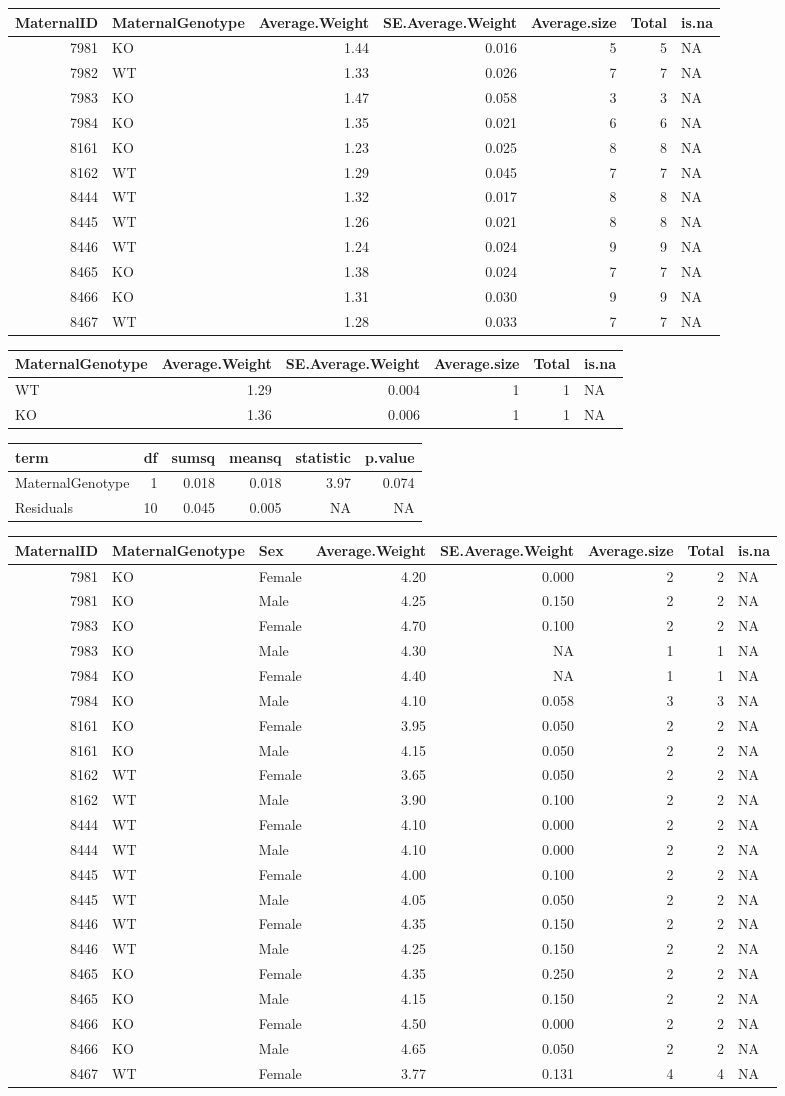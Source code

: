 \documentclass[]{article}
\begin{document}
\begin{longtable}[]{@{}rlrrrrl@{}}
\toprule
MaternalID & MaternalGenotype & Average.Weight & SE.Average.Weight &
Average.size & Total & is.na\tabularnewline
\midrule
\endhead
7981 & KO & 1.44 & 0.016 & 5 & 5 & NA\tabularnewline
7982 & WT & 1.33 & 0.026 & 7 & 7 & NA\tabularnewline
7983 & KO & 1.47 & 0.058 & 3 & 3 & NA\tabularnewline
7984 & KO & 1.35 & 0.021 & 6 & 6 & NA\tabularnewline
8161 & KO & 1.23 & 0.025 & 8 & 8 & NA\tabularnewline
8162 & WT & 1.29 & 0.045 & 7 & 7 & NA\tabularnewline
8444 & WT & 1.32 & 0.017 & 8 & 8 & NA\tabularnewline
8445 & WT & 1.26 & 0.021 & 8 & 8 & NA\tabularnewline
8446 & WT & 1.24 & 0.024 & 9 & 9 & NA\tabularnewline
8465 & KO & 1.38 & 0.024 & 7 & 7 & NA\tabularnewline
8466 & KO & 1.31 & 0.030 & 9 & 9 & NA\tabularnewline
8467 & WT & 1.28 & 0.033 & 7 & 7 & NA\tabularnewline
\bottomrule
\end{longtable}

\begin{longtable}[]{@{}lrrrrl@{}}
\toprule
MaternalGenotype & Average.Weight & SE.Average.Weight & Average.size &
Total & is.na\tabularnewline
\midrule
\endhead
WT & 1.29 & 0.004 & 1 & 1 & NA\tabularnewline
KO & 1.36 & 0.006 & 1 & 1 & NA\tabularnewline
\bottomrule
\end{longtable}

\begin{longtable}[]{@{}lrrrrr@{}}
\toprule
term & df & sumsq & meansq & statistic & p.value\tabularnewline
\midrule
\endhead
MaternalGenotype & 1 & 0.018 & 0.018 & 3.97 & 0.074\tabularnewline
Residuals & 10 & 0.045 & 0.005 & NA & NA\tabularnewline
\bottomrule
\end{longtable}

\begin{longtable}[]{@{}rllrrrrl@{}}
\toprule
MaternalID & MaternalGenotype & Sex & Average.Weight & SE.Average.Weight
& Average.size & Total & is.na\tabularnewline
\midrule
\endhead
7981 & KO & Female & 4.20 & 0.000 & 2 & 2 & NA\tabularnewline
7981 & KO & Male & 4.25 & 0.150 & 2 & 2 & NA\tabularnewline
7983 & KO & Female & 4.70 & 0.100 & 2 & 2 & NA\tabularnewline
7983 & KO & Male & 4.30 & NA & 1 & 1 & NA\tabularnewline
7984 & KO & Female & 4.40 & NA & 1 & 1 & NA\tabularnewline
7984 & KO & Male & 4.10 & 0.058 & 3 & 3 & NA\tabularnewline
8161 & KO & Female & 3.95 & 0.050 & 2 & 2 & NA\tabularnewline
8161 & KO & Male & 4.15 & 0.050 & 2 & 2 & NA\tabularnewline
8162 & WT & Female & 3.65 & 0.050 & 2 & 2 & NA\tabularnewline
8162 & WT & Male & 3.90 & 0.100 & 2 & 2 & NA\tabularnewline
8444 & WT & Female & 4.10 & 0.000 & 2 & 2 & NA\tabularnewline
8444 & WT & Male & 4.10 & 0.000 & 2 & 2 & NA\tabularnewline
8445 & WT & Female & 4.00 & 0.100 & 2 & 2 & NA\tabularnewline
8445 & WT & Male & 4.05 & 0.050 & 2 & 2 & NA\tabularnewline
8446 & WT & Female & 4.35 & 0.150 & 2 & 2 & NA\tabularnewline
8446 & WT & Male & 4.25 & 0.150 & 2 & 2 & NA\tabularnewline
8465 & KO & Female & 4.35 & 0.250 & 2 & 2 & NA\tabularnewline
8465 & KO & Male & 4.15 & 0.150 & 2 & 2 & NA\tabularnewline
8466 & KO & Female & 4.50 & 0.000 & 2 & 2 & NA\tabularnewline
8466 & KO & Male & 4.65 & 0.050 & 2 & 2 & NA\tabularnewline
8467 & WT & Female & 3.77 & 0.131 & 4 & 4 & NA\tabularnewline
\bottomrule
\end{longtable}
\end{document}
